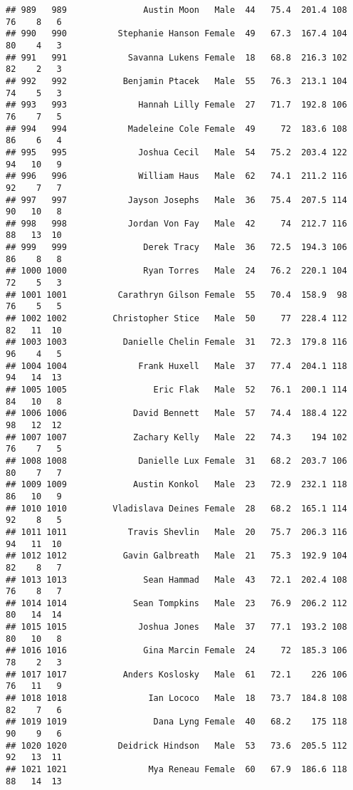 \documentclass[
]{article}
\begin{document}
\begin{verbatim}
## 989   989               Austin Moon   Male  44   75.4  201.4 108  76    8   6
## 990   990          Stephanie Hanson Female  49   67.3  167.4 104  80    4   3
## 991   991            Savanna Lukens Female  18   68.8  216.3 102  82    2   3
## 992   992           Benjamin Ptacek   Male  55   76.3  213.1 104  74    5   3
## 993   993              Hannah Lilly Female  27   71.7  192.8 106  76    7   5
## 994   994            Madeleine Cole Female  49     72  183.6 108  86    6   4
## 995   995              Joshua Cecil   Male  54   75.2  203.4 122  94   10   9
## 996   996              William Haus   Male  62   74.1  211.2 116  92    7   7
## 997   997            Jayson Josephs   Male  36   75.4  207.5 114  90   10   8
## 998   998            Jordan Von Fay   Male  42     74  212.7 116  88   13  10
## 999   999               Derek Tracy   Male  36   72.5  194.3 106  86    8   8
## 1000 1000               Ryan Torres   Male  24   76.2  220.1 104  72    5   3
## 1001 1001          Carathryn Gilson Female  55   70.4  158.9  98  76    5   5
## 1002 1002         Christopher Stice   Male  50     77  228.4 112  82   11  10
## 1003 1003           Danielle Chelin Female  31   72.3  179.8 116  96    4   5
## 1004 1004              Frank Huxell   Male  37   77.4  204.1 118  94   14  13
## 1005 1005                 Eric Flak   Male  52   76.1  200.1 114  84   10   8
## 1006 1006             David Bennett   Male  57   74.4  188.4 122  98   12  12
## 1007 1007             Zachary Kelly   Male  22   74.3    194 102  76    7   5
## 1008 1008              Danielle Lux Female  31   68.2  203.7 106  80    7   7
## 1009 1009             Austin Konkol   Male  23   72.9  232.1 118  86   10   9
## 1010 1010         Vladislava Deines Female  28   68.2  165.1 114  92    8   5
## 1011 1011            Travis Shevlin   Male  20   75.7  206.3 116  94   11  10
## 1012 1012           Gavin Galbreath   Male  21   75.3  192.9 104  82    8   7
## 1013 1013               Sean Hammad   Male  43   72.1  202.4 108  76    8   7
## 1014 1014             Sean Tompkins   Male  23   76.9  206.2 112  80   14  14
## 1015 1015              Joshua Jones   Male  37   77.1  193.2 108  80   10   8
## 1016 1016               Gina Marcin Female  24     72  185.3 106  78    2   3
## 1017 1017           Anders Koslosky   Male  61   72.1    226 106  76   11   9
## 1018 1018                Ian Lococo   Male  18   73.7  184.8 108  82    7   6
## 1019 1019                 Dana Lyng Female  40   68.2    175 118  90    9   6
## 1020 1020          Deidrick Hindson   Male  53   73.6  205.5 112  92   13  11
## 1021 1021                Mya Reneau Female  60   67.9  186.6 118  88   14  13

\end{verbatim}
\end{document}
